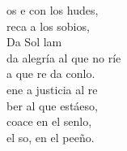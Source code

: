 \begin{cancion}%
	os e con los hudes, \\
	reca a los sobios,\\
Da     Sol           lam\\
da alegría al que no ríe\\
	a que re da conlo.\\
	ene a  justicia al re\\
	ber al que estáeso,\\
	 coace en el senlo,\\
	 el so, en el peeño.\\
\end{cancion}%

